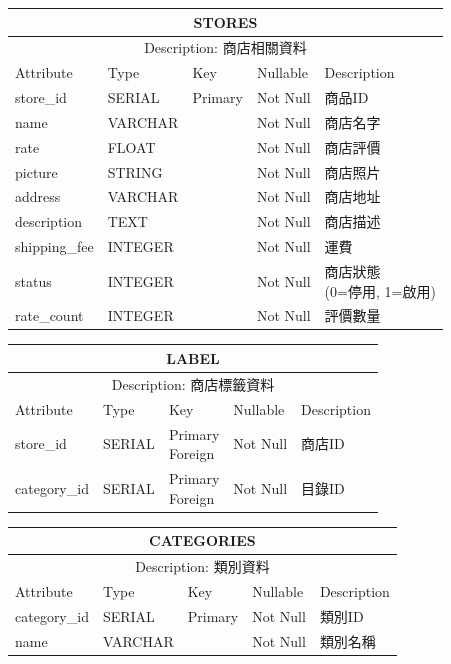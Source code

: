 \documentclass[a4paper, 12pt]{article}
\begin{document}
\noindent\begin{tabular}{ | p{7em} | p{5.5em} | p{5.5em} | p{4.5em} | p{11em} |}
  \hline
  \multicolumn{5}{|c|}{STORES} \tabularnewline
  \hline 
  \multicolumn{5}{|c|}{Description: 商店相關資料} \tabularnewline
  \hline 
  Attribute & Type & Key & Nullable & Description \\
  \hline
  store_id& SERIAL & Primary & Not Null & 商品ID \\
  \hline
  name & VARCHAR & &Not Null &商店名字\\
  \hline
  rate & FLOAT & &Not Null &商店評價\\
  \hline
  picture & STRING & &Not Null &商店照片\\
  \hline
  address & VARCHAR & &Not Null &商店地址\\
  \hline
  description & TEXT & &Not Null &商店描述\\
  \hline
  shipping_fee & INTEGER & &Not Null &運費\\
  \hline
  status & INTEGER & &Not Null &\makecell[l]{商店狀態\\(0=停用, 1=啟用)}\\
  \hline
  rate_count & INTEGER & &Not Null &評價數量\\
  \hline
\end{tabular}
\vspace{1em}

\noindent\begin{tabular}{ | p{7em} | p{5.5em} | p{5.5em} | p{4.5em} | p{11em} |}
  \hline
  \multicolumn{5}{|c|}{LABEL} \tabularnewline
  \hline 
  \multicolumn{5}{|c|}{Description: 商店標籤資料} \tabularnewline
  \hline 
  Attribute & Type & Key & Nullable & Description \\
  \hline
  store_id& SERIAL & \makecell[l]{Primary \\ Foreign}& Not Null & 商店ID \\
  \hline
  category_id & SERIAL & \makecell[l]{Primary \\ Foreign} &Not Null &目錄ID\\
  \hline
\end{tabular}
\vspace{1em}

\noindent\begin{tabular}{ | p{7em} | p{5.5em} | p{5.5em} | p{4.5em} | p{11em} |}
  \hline
  \multicolumn{5}{|c|}{CATEGORIES} \tabularnewline
  \hline 
  \multicolumn{5}{|c|}{Description: 類別資料} \tabularnewline
  \hline 
  Attribute & Type & Key & Nullable & Description \\
  \hline
  category_id& SERIAL & Primary & Not Null & 類別ID \\
  \hline
  name & VARCHAR & &Not Null &類別名稱\\
  \hline
\end{tabular}
\end{document}
